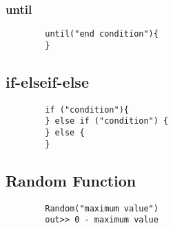 	\subsubsection{until}
	\begin{lstlisting}
		until("end condition"){
		}
	\end{lstlisting}

	\subsection{if-elseif-else}
	\begin{lstlisting}
		if ("condition"){
		} else if ("condition") {
		} else {
		}
	\end{lstlisting}

	\subsection{Random Function}
	\begin{lstlisting}
		Random("maximum value")
		out>> 0 - maximum value
	\end{lstlisting}
